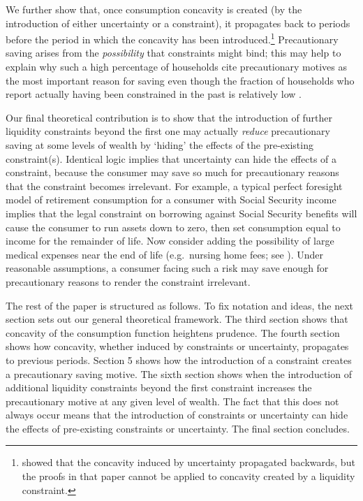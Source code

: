 \documentclass[titlepage]{\econtex}
\newcommand{\ifVerbatimWrite}{\ifthenelse{\boolean{verbatimwriteOn}}} %
\renewenvironment{verbatimwrite}[1]{} %
\renewcommand{\cite}{\citeyear}
\begin{document}
\begin{verbatimwrite}{./Sections/Intro.tex}
We further show that, once consumption concavity is created (by the introduction of either uncertainty or a constraint), it propagates back to periods before the period in which the concavity has been introduced.\footnote{\citet{carroll&kimball:concavity} showed that the concavity induced by uncertainty propagated backwards, but the proofs in that paper cannot be applied to concavity created by a liquidity constraint.} %
Precautionary saving arises from the \textit{possibility} that constraints might bind; this may help to explain why such a high percentage of households cite precautionary motives as the most important reason for saving \citep{kennickell&lusardi:scfquestions} even though the fraction of households who report actually having been constrained in the past is relatively low \citep{jappelli:whoisconstr}.


Our final theoretical contribution is to show that the introduction of further liquidity constraints beyond the first one may actually \textit{reduce} precautionary saving at some levels of wealth by `hiding' the effects of the pre-existing constraint(s). Identical logic implies that uncertainty can hide the effects of a constraint, because the consumer may save so much for precautionary reasons that the constraint becomes irrelevant.  For example, a typical perfect foresight model of retirement consumption for a consumer with Social Security income implies that the legal constraint on borrowing against Social Security benefits will cause the consumer to run assets down to zero, then set consumption equal to income for the remainder of life.  Now consider adding the possibility of large medical expenses near the end of life (e.g.\ nursing home fees; see \cite{aclvJoy}).  Under reasonable assumptions, a consumer facing such a risk may save enough for precautionary reasons to render the constraint irrelevant.

The rest of the paper is structured as follows.  To fix notation and ideas, the next section sets out our general theoretical framework. The third section shows that concavity of the consumption function heightens prudence.  The fourth section shows how concavity, whether induced by constraints or uncertainty, propagates to previous periods. Section 5 shows how the introduction of a constraint creates a precautionary saving motive. The sixth section shows when the introduction of additional liquidity constraints beyond the first constraint increases the precautionary motive at any given level of wealth.  The fact that this does not always occur means that the introduction of constraints or uncertainty can hide the effects of pre-existing constraints or uncertainty. The final section concludes.

\end{verbatimwrite}\ifVerbatimWrite{}{} %
\end{document}
